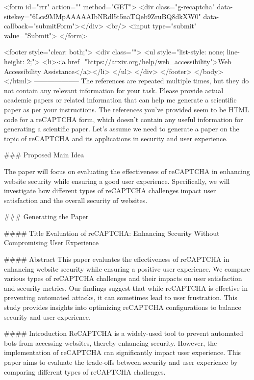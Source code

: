        <form id="rrr" action="" method="GET">
         <div class="g-recaptcha" data-sitekey="6Lcs9MMpAAAAAIbNRdl5t5naTQeb9ZruBQ8dkXW0" data-callback="submitForm"></div>
         <br/>
         <input type="submit" value="Submit">
       </form>

       <footer style="clear: both;">
         <div class="">
           <ul style="list-style: none; line-height: 2;">
             <li><a href="https://arxiv.org/help/web_accessibility">Web Accessibility Assistance</a></li>
           </ul>
         </div>
       </footer>
        </body>
      </html>
        --------------------
         The references are repeated multiple times, but they do not contain any relevant information for your task. Please provide actual academic papers or related information that can help me generate a scientific paper as per your instructions. The references you've provided seem to be HTML code for a reCAPTCHA form, which doesn't contain any useful information for generating a scientific paper. Let's assume we need to generate a paper on the topic of reCAPTCHA and its applications in security and user experience. 

### Proposed Main Idea

The paper will focus on evaluating the effectiveness of reCAPTCHA in enhancing website security while ensuring a good user experience. Specifically, we will investigate how different types of reCAPTCHA challenges impact user satisfaction and the overall security of websites.

### Generating the Paper

#### Title
Evaluation of reCAPTCHA: Enhancing Security Without Compromising User Experience

#### Abstract
This paper evaluates the effectiveness of reCAPTCHA in enhancing website security while ensuring a positive user experience. We compare various types of reCAPTCHA challenges and their impacts on user satisfaction and security metrics. Our findings suggest that while reCAPTCHA is effective in preventing automated attacks, it can sometimes lead to user frustration. This study provides insights into optimizing reCAPTCHA configurations to balance security and user experience.

#### Introduction
ReCAPTCHA is a widely-used tool to prevent automated bots from accessing websites, thereby enhancing security. However, the implementation of reCAPTCHA can significantly impact user experience. This paper aims to evaluate the trade-offs between security and user experience by comparing different types of reCAPTCHA challenges.

